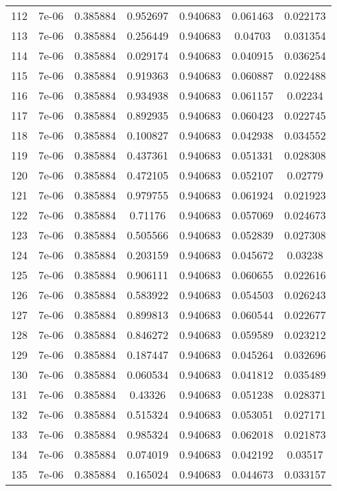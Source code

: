 \begin{table}
\begin{tabular*}{\linewidth}{c|c|c|c|c|c|c}
112 & 7e-06 & 0.385884 & 0.952697 & 0.940683 & 0.061463 & 0.022173\\
113 & 7e-06 & 0.385884 & 0.256449 & 0.940683 & 0.04703 & 0.031354\\
114 & 7e-06 & 0.385884 & 0.029174 & 0.940683 & 0.040915 & 0.036254\\
115 & 7e-06 & 0.385884 & 0.919363 & 0.940683 & 0.060887 & 0.022488\\
116 & 7e-06 & 0.385884 & 0.934938 & 0.940683 & 0.061157 & 0.02234\\
117 & 7e-06 & 0.385884 & 0.892935 & 0.940683 & 0.060423 & 0.022745\\
118 & 7e-06 & 0.385884 & 0.100827 & 0.940683 & 0.042938 & 0.034552\\
119 & 7e-06 & 0.385884 & 0.437361 & 0.940683 & 0.051331 & 0.028308\\
120 & 7e-06 & 0.385884 & 0.472105 & 0.940683 & 0.052107 & 0.02779\\
121 & 7e-06 & 0.385884 & 0.979755 & 0.940683 & 0.061924 & 0.021923\\
122 & 7e-06 & 0.385884 & 0.71176 & 0.940683 & 0.057069 & 0.024673\\
123 & 7e-06 & 0.385884 & 0.505566 & 0.940683 & 0.052839 & 0.027308\\
124 & 7e-06 & 0.385884 & 0.203159 & 0.940683 & 0.045672 & 0.03238\\
125 & 7e-06 & 0.385884 & 0.906111 & 0.940683 & 0.060655 & 0.022616\\
126 & 7e-06 & 0.385884 & 0.583922 & 0.940683 & 0.054503 & 0.026243\\
127 & 7e-06 & 0.385884 & 0.899813 & 0.940683 & 0.060544 & 0.022677\\
128 & 7e-06 & 0.385884 & 0.846272 & 0.940683 & 0.059589 & 0.023212\\
129 & 7e-06 & 0.385884 & 0.187447 & 0.940683 & 0.045264 & 0.032696\\
130 & 7e-06 & 0.385884 & 0.060534 & 0.940683 & 0.041812 & 0.035489\\
131 & 7e-06 & 0.385884 & 0.43326 & 0.940683 & 0.051238 & 0.028371\\
132 & 7e-06 & 0.385884 & 0.515324 & 0.940683 & 0.053051 & 0.027171\\
133 & 7e-06 & 0.385884 & 0.985324 & 0.940683 & 0.062018 & 0.021873\\
134 & 7e-06 & 0.385884 & 0.074019 & 0.940683 & 0.042192 & 0.03517\\
135 & 7e-06 & 0.385884 & 0.165024 & 0.940683 & 0.044673 & 0.033157\\
\end{tabular*}
\end{table}
